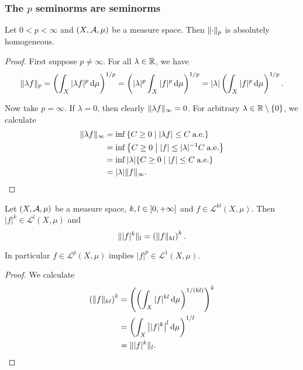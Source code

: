 \subsubsection{The $p$ seminorms are seminorms}
\begin{lemma} \label{pNormAbsolutelyHomogeneous}
Let $0< p<\infty$ and $\sSet{X,\mathcal{A},\mu}$ be a measure space. Then $\lVert\cdot\rVert_p$ is absolutely homogeneous.
\end{lemma}
\begin{proof}
First suppose $p\neq \infty$. For all $\lambda\in \mathbb{R}$, we have
\[ \lVert\lambda f\rVert_{p} = \left(\int_X |\lambda f|^p\operatorname{d \!}{\mu}\right)^{1/p} = \left(|\lambda|^p\int_X |f|^p\operatorname{d \!}{\mu}\right)^{1/p} = |\lambda|\left(\int_X |f|^p\operatorname{d \!}{\mu}\right)^{1/p}. \]


Now take $p= \infty$. If $\lambda = 0$, then clearly $\lVert\lambda f\rVert_\infty = 0$. For arbitrary $\lambda\in \mathbb{R}\setminus\{0\}$, we calculate
\begin{align*}
\norm{\lambda f}_\infty &= \inf\setbuilder{C \geq 0}{|\lambda f| \leq C \; \text{a.e.}} \\
&= \inf\setbuilder{C \geq 0}{|f| \leq |\lambda|^{-1}C \; \text{a.e.}} \\
&= \inf|\lambda|\setbuilder{C \geq 0}{|f| \leq C \; \text{a.e.}} \\
&= |\lambda|\norm{f}_\infty.
\end{align*}
\end{proof}

\begin{lemma} \label{pnormLemma}
Let $\sSet{X,\mathcal{A},\mu}$ be a measure space, $k,l\in\interval[oc]{0,+\infty}$ and $f\in \mathcal{L}^{kl}(X,\mu)$. Then $|f|^k \in \mathcal{L}^{l}(X,\mu)$ and
\[ \lVert|f|^k\rVert_l = \left(\lVert f\rVert_{kl}\right)^k. \]
\end{lemma}
In particular $f\in \mathcal{L}^p(X,\mu)$ implies $|f|^p \in 
\mathcal{L}^1(X,\mu)$.
\begin{proof}
We calculate
\begin{align*}
\left(\lVert f\rVert_{kl}\right)^k &= \left(\left(\int_X|f|^{kl}\operatorname{d \!}{\mu}\right)^{1/(kl)}\right)^{k} \\
&= \left(\int_X\big||f|^{k}\big|^l\operatorname{d \!}{\mu}\right)^{1/l} \\
&= \lVert|f|^k\rVert_l.
\end{align*}
\end{proof}

